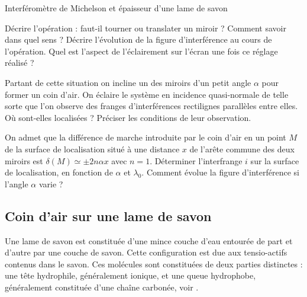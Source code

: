 \begin{exo}[PC][2][devoir]{Interféromètre de Michelson et épaisseur d'une lame de savon}
\begin{quest}
  \item Décrire l'opération : faut-il tourner ou translater un miroir ? Comment savoir dans quel sens ? Décrire
l'évolution de la figure d'interférence au cours de l'opération. Quel est l'aspect de l'éclairement sur l'écran une
fois ce réglage réalisé ?
\item Partant de cette situation on incline un des miroirs d'un petit angle $\alpha$ pour former un coin d'air. On
éclaire le système en incidence quasi-normale de telle sorte que l'on observe des franges d'interférences rectilignes
parallèles entre elles. Où sont-elles localisées ? Préciser les conditions de leur observation.
\item On admet que la différence de marche introduite par le coin d'air en un point $M$ de la surface de
localisation situé à une distance $x$ de l'arête commune des deux miroirs est $\delta(M ) \simeq \pm 2 n \alpha x$ avec $n = 1$.
Déterminer l'interfrange $i$ sur la surface de localisation, en fonction de $\alpha$ et $\lambda_0$. Comment évolue la figure
d'interférence si l'angle $\alpha$ varie ?

\end{quest}

\subsection{Coin d'air sur une lame de savon}


Une lame de savon est constituée d'une mince couche d'eau entourée de part et d'autre par
une couche de savon. Cette configuration est due aux tensio-actifs contenus dans le savon. Ces molécules sont
constituées de deux parties distinctes : une tête hydrophile, généralement ionique, et une queue hydrophobe,
généralement constituée d'une chaîne carbonée, voir .


\end{exo}
